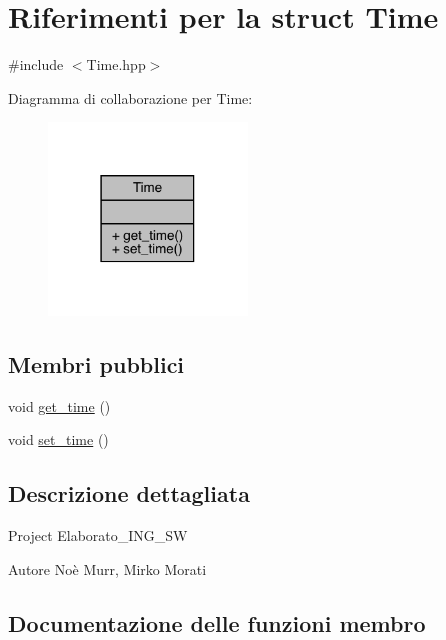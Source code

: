 \hypertarget{struct_time}{}\section{Riferimenti per la struct Time}
\label{struct_time}


{\ttfamily \#include $<$Time.\+hpp$>$}



Diagramma di collaborazione per Time\+:
\nopagebreak
\begin{figure}[H]
\begin{center}
\leavevmode
\includegraphics[width=150pt]{df/d8c/struct_time__coll__graph}
\end{center}
\end{figure}
\subsection*{Membri pubblici}
\begin{DoxyCompactItemize}
\item 
void \mbox{\hyperlink{struct_time_ab9a42b7809f059a61d89123fb6cd0cf5}{get\+\_\+time}} ()
\item 
void \mbox{\hyperlink{struct_time_a76fe3565c8497fe80720123aa0b988fb}{set\+\_\+time}} ()
\end{DoxyCompactItemize}


\subsection{Descrizione dettagliata}
Project Elaborato\+\_\+\+I\+N\+G\+\_\+\+SW \begin{DoxyAuthor}{Autore}
Noè Murr, Mirko Morati 
\end{DoxyAuthor}


\subsection{Documentazione delle funzioni membro}
\mbox{\label{struct_time_ab9a42b7809f059a61d89123fb6cd0cf5}} 
